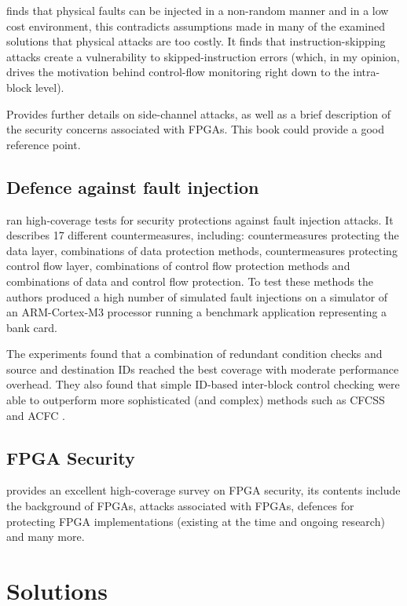 \cite{Kelly2017} finds that physical faults can be injected in a non-random manner and in a low cost environment, this contradicts assumptions made in many of the examined solutions that physical attacks are too costly. It finds that instruction-skipping attacks create a vulnerability to skipped-instruction errors (which, in my opinion, drives the motivation behind control-flow monitoring right down to the intra-block level).

\cite{GebotysCatherineH2010Sied} Provides further details on side-channel attacks, as well as a brief description of the security concerns associated with FPGAs. This book could provide a good reference point.

\subsection{Defence against fault injection}

\cite{Theissing2013} ran high-coverage tests for security protections against fault injection attacks. It describes 17 different countermeasures, including: countermeasures protecting the data layer, combinations of data protection methods, countermeasures protecting control flow layer, combinations of control flow protection methods and combinations of data and control flow protection. To test these methods the authors produced a high number of simulated fault injections on a simulator of an ARM-Cortex-M3 processor running a benchmark application representing a bank card.

The experiments found that a combination of redundant condition checks  and source and destination IDs reached the best coverage with moderate performance overhead. They also found that simple ID-based inter-block control checking were able to outperform more sophisticated (and complex) methods such as CFCSS   and ACFC  .

\subsection{FPGA Security}

\cite{Drimer2008} provides an excellent high-coverage survey on FPGA security, its contents include the background of FPGAs, attacks associated with FPGAs, defences for protecting FPGA implementations (existing at the time and ongoing research) and many more. 

\section{Solutions}

